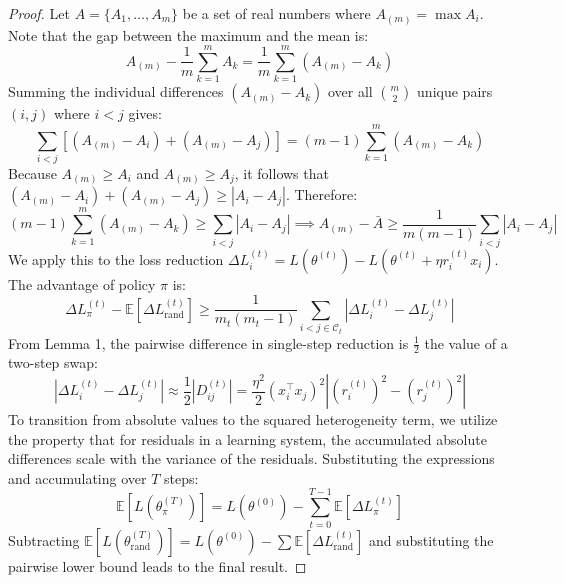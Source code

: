 \begin{proof}
Let $A = \{A_1, \dots, A_m\}$ be a set of real numbers where $A_{(m)} = \max A_i$. Note that the gap between the maximum and the mean is:
\begin{equation}
    A_{(m)} - \frac{1}{m} \sum_{k=1}^m A_k = \frac{1}{m} \sum_{k=1}^m (A_{(m)} - A_k)
\end{equation}
Summing the individual differences $(A_{(m)} - A_k)$ over all $\binom{m}{2}$ unique pairs $(i, j)$ where $i < j$ gives:
\begin{equation}
    \sum_{i < j} \left[ (A_{(m)} - A_i) + (A_{(m)} - A_j) \right] = (m-1) \sum_{k=1}^m (A_{(m)} - A_k)
\end{equation}
Because $A_{(m)} \geq A_i$ and $A_{(m)} \geq A_j$, it follows that $(A_{(m)} - A_i) + (A_{(m)} - A_j) \geq |A_i - A_j|$. Therefore:
\begin{equation}
    (m-1) \sum_{k=1}^m (A_{(m)} - A_k) \geq \sum_{i < j} |A_i - A_j| \implies A_{(m)} - \bar{A} \geq \frac{1}{m(m-1)} \sum_{i < j} |A_i - A_j|
\end{equation}
We apply this to the loss reduction $\Delta L_i^{(t)} = L(\theta^{(t)}) - L(\theta^{(t)} + \eta r_i^{(t)} x_i)$. The advantage of policy $\pi$ is:
\begin{equation}
    \Delta L_{\pi}^{(t)} - \mathbb{E}[\Delta L_{\text{rand}}^{(t)}] \geq \frac{1}{m_t(m_t-1)} \sum_{i < j \in \mathcal{C}_t} |\Delta L_i^{(t)} - \Delta L_j^{(t)}|
\end{equation}
From Lemma 1, the pairwise difference in single-step reduction is $\frac{1}{2}$ the value of a two-step swap:
\begin{equation}
    |\Delta L_i^{(t)} - \Delta L_j^{(t)}| \approx \frac{1}{2} |D_{ij}^{(t)}| = \frac{\eta^2}{2} (x_i^\top x_j)^2 |(r_i^{(t)})^2 - (r_j^{(t)})^2|
\end{equation}
To transition from absolute values to the squared heterogeneity term, we utilize the property that for residuals in a learning system, the accumulated absolute differences scale with the variance of the residuals. Substituting the expressions and accumulating over $T$ steps:
\begin{equation}
    \mathbb{E}[L(\theta^{(T)}_\pi)] = L(\theta^{(0)}) - \sum_{t=0}^{T-1} \mathbb{E}[\Delta L_\pi^{(t)}]
\end{equation}
Subtracting $\mathbb{E}[L(\theta^{(T)}_{\text{rand}})] = L(\theta^{(0)}) - \sum \mathbb{E}[\Delta L_{\text{rand}}^{(t)}]$ and substituting the pairwise lower bound leads to the final result.
\end{proof}


